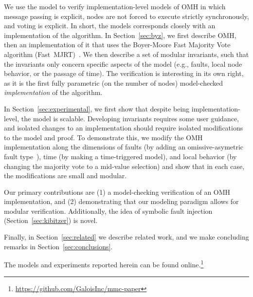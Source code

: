 \documentclass{llncs/llncs}
\newcommand{\OMH}{\ensuremath{\mathrm{OMH}}\xspace}
\begin{document}

We use the model to verify implementation-level models of $\OMH$ in which message passing is explicit, nodes are not forced to execute strictly synchronously, and voting is explicit. In short, the models corresponds closely with an implementation of the algorithm. In Section~\ref{sec:byz}, we first describe \OMH, then an implementation of it that uses the Boyer-Moore Fast Majority Vote algorithm (Fast~MJRT)~\cite{mjrty}. We then describe a set of modular invariants, such that the invariants only concern specific aspects of the model (e.g., faults, local node behavior, or the passage of time). The verification is interesting in its own right, as it is the first fully parametric (on the number of nodes) model-checked \emph{implementation} of the algorithm.

In Section~\ref{sec:experimental}, we first show that despite being implementation-level, the model is scalable. Developing invariants requires some user guidance, and isolated changes to an implementation should require isolated modifications to the model and proof. To demonstrate this, we modify the \OMH implementation along the dimensions of faults (by adding an omissive-asymetric fault type~\cite{omissive}), time (by making a time-triggered model), and local behavior (by changing the majority vote to a mid-value selection) and show that in each case, the modifications are small and modular.

Our primary contributions are (1) a model-checking verification of an $\OMH$ implementation, and (2) demonstrating that our modeling paradigm allows for modular verification. Additionally, the idea of symbolic fault injection (Section~\ref{sec:kibitzer}) is novel.

Finally, in Section~\ref{sec:related} we describe related work, and we make concluding remarks in Section~\ref{sec:conclusions}.

The models and experiments reported herein can be found online.\footnote{\url{https://github.com/GaloisInc/mmc-paper}}

\end{document}
